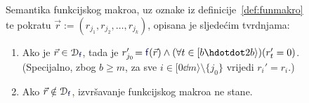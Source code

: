 \begin{propozicija}[{name=[semantika funkcijskog makroa]}]\label{prop:semfmacro}
Semantika funkcijskog makroa, uz oznake iz definicije~\ref{def:funmakro}\\ te pokratu $\vec r:=(r_{j_1},r_{j_2},\dotsc,r_{j_k})$, opisana je sljedećim tvrdnjama:
\begin{enumerate}
    \item\label{case:in} Ako je $\vec r\in\dom{\f{f}}$, tada je $r_{j_0}'\!=\f{f}(\vec r)\land(\forall t\in[b\dd 2b\rangle)(r_t'=0)$.\\
    (Specijalno, zbog $b\ge m$, za sve $i\in[0\dd m\rangle\setminus\{j_0\}$ vrijedi $r_i'=r_i$.)
    \item\label{case:notin} Ako $\vec r\notin\dom{\f{f}}$, izvršavanje funkcijskog makroa ne stane.
\end{enumerate}
\end{propozicija}

